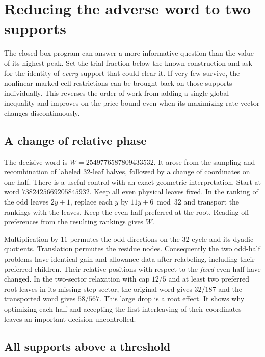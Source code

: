 \section{Reducing the adverse word to two supports}
\label{sec:two-support-census}

The closed-box program can answer a more informative question than the value of its highest peak. Set the trial fraction below the known construction and ask for the identity of \emph{every} support that could clear it. If very few survive, the nonlinear marked-cell restrictions can be brought back on those supports individually. This reverses the order of work from adding a single global inequality and improves on the price bound even when its maximizing rate vector changes discontinuously.

\subsection{A change of relative phase}

The decisive word is \(W=2549776587809433532\). It arose from the sampling and recombination of labeled 32-leaf halves, followed by a change of coordinates on one half. There is a useful control with an exact geometric interpretation. Start at word \(7382425669205845932\). Keep all even physical leaves fixed. In the ranking of the odd leaves \(2y+1\), replace each \(y\) by \(11y+6\bmod 32\) and transport the rankings with the leaves. Keep the even half preferred at the root. Reading off preferences from the resulting rankings gives \(W\).

Multiplication by \(11\) permutes the odd directions on the 32-cycle and its dyadic quotients. Translation permutes the residue nodes. Consequently the two odd-half problems have identical gain and allowance data after relabeling, including their preferred children. Their relative positions with respect to the \emph{fixed} even half have changed. In the two-sector relaxation with cap \(12/5\) and at least two preferred root leaves in its missing-step sector, the original word gives \(32/187\) and the transported word gives \(58/567\). This large drop is a root effect. It shows why optimizing each half and accepting the first interleaving of their coordinates leaves an important decision uncontrolled.

\subsection{All supports above a threshold}

